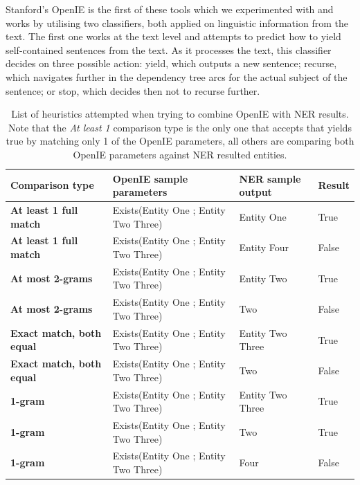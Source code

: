 \documentclass[11pt,a4paper,openright]{memoir}
\begin{document}
Stanford's OpenIE \cite{angeli-johnsonpremkumar-manning:2015:ACL-IJCNLP} is the first of these tools which we experimented with and works by utilising two classifiers, both applied on linguistic information from the text. The first one works at the text level and attempts to predict how to yield self-contained sentences from the text. As it processes the text, this classifier decides on three possible action: yield, which outputs a new sentence; recurse, which navigates further in the dependency tree arcs for the actual subject of the sentence; or stop, which decides then not to recurse further.


\begin{table}[!htbp]
  \centering
  \tiny
    \begin{tabular}{|m{2cm}|m{5cm}|m{2cm}|m{1cm}|}
\hline

\textbf{Comparison type} &
\textbf{OpenIE sample parameters} &
\textbf{NER sample output} &
\textbf{Result} \\
\hline

\textbf{At least 1 full match}  &
Exists(Entity One ; Entity Two Three)  &
Entity One &
True \\
\hline

\textbf{At least 1 full match}  &
Exists(Entity One ; Entity Two Three)  &
Entity Four &
False \\
\hline

\textbf{At most 2-grams}  &
Exists(Entity One ; Entity Two Three)  &
Entity Two &
True \\
\hline

\textbf{At most 2-grams}  &
Exists(Entity One ; Entity Two Three)  &
Two &
False \\
\hline

\textbf{Exact match, both equal}  &
Exists(Entity One ; Entity Two Three)  &
Entity Two Three &
True \\
\hline

\textbf{Exact match, both equal}  &
Exists(Entity One ; Entity Two Three)  &
Two &
False \\
\hline

\textbf{1-gram}  &
Exists(Entity One ; Entity Two Three)  &
Entity Two Three &
True \\
\hline

\textbf{1-gram}  &
Exists(Entity One ; Entity Two Three)  &
Two &
True \\
\hline

\textbf{1-gram}  &
Exists(Entity One ; Entity Two Three)  &
Four &
False \\
\hline

    \end{tabular}
  \caption[List of heuristics attempted when trying to combine OpenIE with NER results.]{List of heuristics attempted when trying to combine OpenIE with NER results. Note that the \emph{At least 1} comparison type is the only one that accepts that yields true by matching only 1 of the OpenIE parameters, all others are comparing both OpenIE parameters against NER resulted entities.}
  \label{tab:ngram_comparison}
\end{table}
\end{document}
